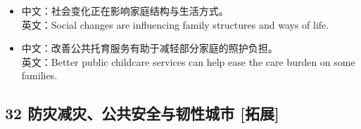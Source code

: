 \documentclass[a4paper,11pt,UTF8,fontset=none]{ctexart}
\begin{document}
\par

\begin{itemize}[leftmargin=1.7em,itemsep=1pt,parsep=0pt,topsep=2pt]
\item \noindent 中文：社会变化正在影响家庭结构与生活方式。\\ 英文：Social changes are influencing family structures and ways of life.\par


\item \noindent 中文：改善公共托育服务有助于减轻部分家庭的照护负担。\\ 英文：Better public childcare services can help ease the care burden on some families.\par


\end{itemize}

\subsection{32 防灾减灾、公共安全与韧性城市 {\color{AccentBlue} [拓展]}}
\end{document}
